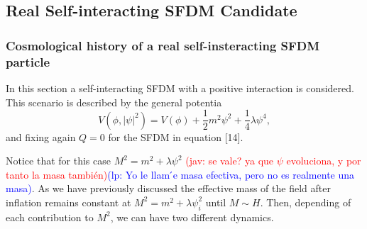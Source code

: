 \documentclass[amssymb,twocolumn,prd,nofootinbib,showpacs]{revtex4-1}
\newcommand{\jav}[1]{\textcolor{red}{(jav: #1)}}
\newcommand{\lp}[1]{\textcolor{blue}{(lp: #1)}}
\begin{document}
\subsection{Real Self-interacting SFDM Candidate}
\subsubsection{Cosmological history of a real self-insteracting SFDM particle}

In this section a self-interacting SFDM with a positive interaction is considered. This scenario is described by the general potentia
\begin{equation}
V(\phi,|\psi|^2)=V(\phi)+\frac{1}{2}m^2\psi^2+\frac{1}{4}\lambda\psi^4,
\end{equation}
and fixing again $Q=0$ for the SFDM in equation [14].

Notice that for this case $M^2=m^2+\lambda\psi^2$ \jav{se vale? ya que $\psi$ 
evoluciona, y por tanto la masa también}\lp{Yo le llam ́e masa efectiva,
pero no es realmente una masa}. 
As we have previously discussed the effective mass of the field after inflation remains 
constant at $M^2=m^2+\lambda\psi_i^2$ until $M\sim H$. Then, depending of each contribution to $M^2$, we can 
have two different dynamics. 
\\
\end{document}

